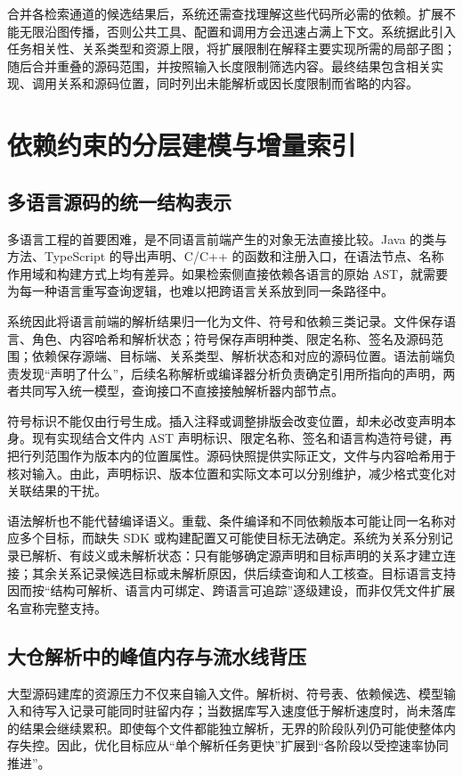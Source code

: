 合并各检索通道的候选结果后，系统还需查找理解这些代码所必需的依赖。扩展不能无限沿图传播，否则公共工具、配置和调用方会迅速占满上下文。系统据此引入任务相关性、关系类型和资源上限，将扩展限制在解释主要实现所需的局部子图；随后合并重叠的源码范围，并按照输入长度限制筛选内容。最终结果包含相关实现、调用关系和源码位置，同时列出未能解析或因长度限制而省略的内容。

\chapter{依赖约束的分层建模与增量索引}
\label{chap:indexing}

\section{多语言源码的统一结构表示}

多语言工程的首要困难，是不同语言前端产生的对象无法直接比较。Java 的类与方法、TypeScript 的导出声明、C/C++ 的函数和注册入口，在语法节点、名称作用域和构建方式上均有差异。如果检索侧直接依赖各语言的原始 AST，就需要为每一种语言重写查询逻辑，也难以把跨语言关系放到同一条路径中。

系统因此将语言前端的解析结果归一化为文件、符号和依赖三类记录。文件保存语言、角色、内容哈希和解析状态；符号保存声明种类、限定名称、签名及源码范围；依赖保存源端、目标端、关系类型、解析状态和对应的源码位置。语法前端负责发现“声明了什么”，后续名称解析或编译器分析负责确定引用所指向的声明，两者共同写入统一模型，查询接口不直接接触解析器内部节点。

符号标识不能仅由行号生成。插入注释或调整排版会改变位置，却未必改变声明本身。现有实现结合文件内 AST 声明标识、限定名称、签名和语言构造符号键，再把行列范围作为版本内的位置属性。源码快照提供实际正文，文件与内容哈希用于核对输入。由此，声明标识、版本位置和实际文本可以分别维护，减少格式变化对关联结果的干扰。

语法解析也不能代替编译语义。重载、条件编译和不同依赖版本可能让同一名称对应多个目标，而缺失 SDK 或构建配置又可能使目标无法确定。系统为关系分别记录已解析、有歧义或未解析状态：只有能够确定源声明和目标声明的关系才建立连接；其余关系记录候选目标或未解析原因，供后续查询和人工核查。目标语言支持因而按“结构可解析、语言内可绑定、跨语言可追踪”逐级建设，而非仅凭文件扩展名宣称完整支持。

\section{大仓解析中的峰值内存与流水线背压}

大型源码建库的资源压力不仅来自输入文件。解析树、符号表、依赖候选、模型输入和待写入记录可能同时驻留内存；当数据库写入速度低于解析速度时，尚未落库的结果会继续累积。即使每个文件都能独立解析，无界的阶段队列仍可能使整体内存失控。因此，优化目标应从“单个解析任务更快”扩展到“各阶段以受控速率协同推进”。

